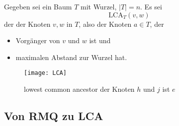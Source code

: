 Gegeben sei ein Baum \( T \) mit Wurzel, \( \left\vert T \right\vert = n \). Es sei
\begin{equation*}
  \text{LCA}_T(v,w)
\end{equation*}
der  der Knoten \( v,w \) in \( T \), also der Knoten \( a \in T \), der
\begin{itemize}
  \item Vorgänger von \( v \) und \( w \) ist und
  \item maximalen Abstand zur Wurzel hat.
\end{itemize}

\begin{figure}[H]
  \texttt{[image: LCA]}
  \caption{lowest common ancestor der Knoten \( h \) und \( j \) ist \( e \)}
\end{figure}

\subsection{Von RMQ zu LCA}

